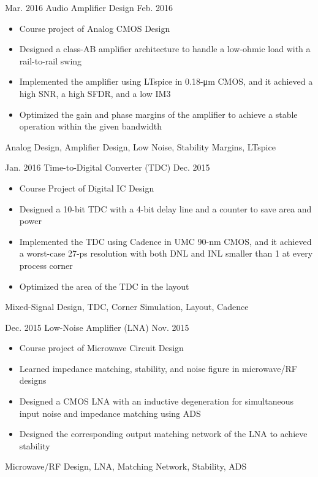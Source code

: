 \begin{projects}
  \project
    {Mar. 2016}   {Audio Amplifier Design}
    {Feb. 2016} {
                      \begin{itemize}
                        \item Course project of Analog CMOS Design
                        \item Designed a class-AB amplifier architecture to handle a low-ohmic load with a rail-to-rail swing
                        \item Implemented the amplifier using LTspice in 0.18-μm CMOS, and it achieved a high SNR, a high SFDR, and a low IM3
                        \item Optimized the gain and phase margins of the amplifier to achieve a stable operation within the given bandwidth
                      \end{itemize}
                    }
                    {Analog Design, Amplifier Design, Low Noise, Stability Margins, LTspice}
  \emptySeparator

  \project
    {Jan. 2016}   {Time-to-Digital Converter (TDC)}
    {Dec. 2015} {
                      \begin{itemize}
                        \item Course Project of Digital IC Design
                        \item Designed a 10-bit TDC with a 4-bit delay line and a counter to save area and power
                        \item Implemented the TDC using Cadence in UMC 90-nm CMOS, and it achieved a worst-case 27-ps resolution with both DNL and INL smaller than 1 at every process corner
                        \item Optimized the area of the TDC in the layout
                      \end{itemize}
                    }
                    {Mixed-Signal Design, TDC, Corner Simulation, Layout, Cadence}
  \emptySeparator

  \project
    {Dec. 2015}   {Low-Noise Amplifier (LNA)}
    {Nov. 2015} {
                      \begin{itemize}
                        \item Course project of Microwave Circuit Design
                        \item Learned impedance matching, stability, and noise figure in microwave/RF designs
                        \item Designed a CMOS LNA with an inductive degeneration for simultaneous input noise and impedance matching using ADS
                        \item Designed the corresponding output matching network of the LNA to achieve stability
                      \end{itemize}
                    }
                    {Microwave/RF Design, LNA, Matching Network, Stability, ADS}
    \emptySeparator


\end{projects}
